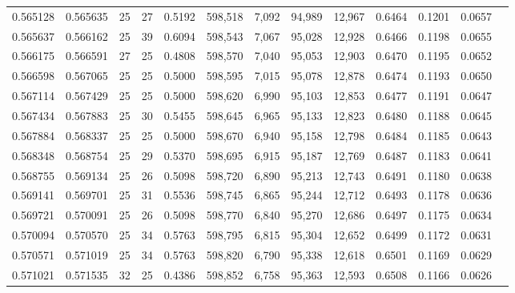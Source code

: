 \begin{tabular}{rrrrrrrrrrrrr}
0.565128 & 0.565635 &    25 &  27 &                                     0.5192 & 598,518 &   7,092 &  94,989 &  12,967 & 0.6464 & 0.1201 & 0.0657 \\
0.565637 & 0.566162 &    25 &  39 &                                     0.6094 & 598,543 &   7,067 &  95,028 &  12,928 & 0.6466 & 0.1198 & 0.0655 \\
0.566175 & 0.566591 &    27 &  25 &                                     0.4808 & 598,570 &   7,040 &  95,053 &  12,903 & 0.6470 & 0.1195 & 0.0652 \\
0.566598 & 0.567065 &    25 &  25 &                                     0.5000 & 598,595 &   7,015 &  95,078 &  12,878 & 0.6474 & 0.1193 & 0.0650 \\
0.567114 & 0.567429 &    25 &  25 &                                     0.5000 & 598,620 &   6,990 &  95,103 &  12,853 & 0.6477 & 0.1191 & 0.0647 \\
0.567434 & 0.567883 &    25 &  30 &                                     0.5455 & 598,645 &   6,965 &  95,133 &  12,823 & 0.6480 & 0.1188 & 0.0645 \\
0.567884 & 0.568337 &    25 &  25 &                                     0.5000 & 598,670 &   6,940 &  95,158 &  12,798 & 0.6484 & 0.1185 & 0.0643 \\
0.568348 & 0.568754 &    25 &  29 &                                     0.5370 & 598,695 &   6,915 &  95,187 &  12,769 & 0.6487 & 0.1183 & 0.0641 \\
0.568755 & 0.569134 &    25 &  26 &                                     0.5098 & 598,720 &   6,890 &  95,213 &  12,743 & 0.6491 & 0.1180 & 0.0638 \\
0.569141 & 0.569701 &    25 &  31 &                                     0.5536 & 598,745 &   6,865 &  95,244 &  12,712 & 0.6493 & 0.1178 & 0.0636 \\
0.569721 & 0.570091 &    25 &  26 &                                     0.5098 & 598,770 &   6,840 &  95,270 &  12,686 & 0.6497 & 0.1175 & 0.0634 \\
0.570094 & 0.570570 &    25 &  34 &                                     0.5763 & 598,795 &   6,815 &  95,304 &  12,652 & 0.6499 & 0.1172 & 0.0631 \\
0.570571 & 0.571019 &    25 &  34 &                                     0.5763 & 598,820 &   6,790 &  95,338 &  12,618 & 0.6501 & 0.1169 & 0.0629 \\
0.571021 & 0.571535 &    32 &  25 &                                     0.4386 & 598,852 &   6,758 &  95,363 &  12,593 & 0.6508 & 0.1166 & 0.0626 \\

\end{tabular}
